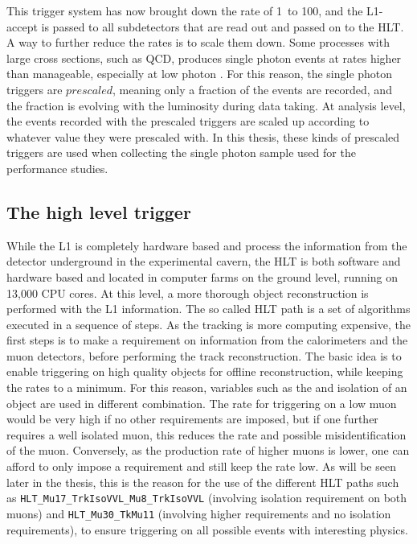 This trigger system has now brought down the rate of 1\GHz\ to 100\kHz, and the L1-accept is passed to all subdetectors that are read out and passed on to the HLT.
\newpara
\noindent\justify
A way to further reduce the rates is to scale them down. 
Some processes with large cross sections, such as QCD, produces single photon events at rates higher than manageable, especially at low photon \pt. 
For this reason, the single photon triggers are $prescaled$, meaning only a fraction of the events are recorded, and the fraction is evolving with the luminosity during data taking. 
At analysis level, the events recorded with the prescaled triggers are scaled up according to whatever value they were prescaled with. 
In this thesis, these kinds of prescaled triggers are used when collecting the single photon sample used for the \ptmiss performance studies.  
\subsection*{The high level trigger}
\noindent\justify
While the L1 is completely hardware based and process the information from the detector underground in the experimental cavern, the HLT is both software and hardware based and located in computer farms on the ground level, running on 13,000 CPU cores. 
At this level, a more thorough object reconstruction is performed with the L1 information. The so called HLT path is a set of algorithms executed in a sequence of steps. 
As the tracking is more computing expensive, the first steps is to make a requirement on information from the calorimeters and the muon detectors, before performing the track reconstruction. 
\newpara
\noindent\justify
The basic idea is to enable triggering on high quality objects for offline reconstruction, while keeping the rates to a minimum. 
For this reason, variables such as the \pt and isolation of an object are used in different combination. 
The rate for triggering on a low \pt muon would be very high if no other requirements are imposed, but if one further requires a well isolated muon, this reduces the rate and possible misidentification of the muon. 
Conversely, as the production rate of higher \pt muons is lower, one can afford to only impose a \pt requirement and still keep the rate low.   
As will be seen later in the thesis, this is the reason for the use of the different HLT paths such as \texttt{HLT\_Mu17\_TrkIsoVVL\_Mu8\_TrkIsoVVL} (involving isolation requirement on both muons) and \texttt{HLT\_Mu30\_TkMu11} (involving higher \pt requirements and no isolation requirements), to ensure triggering on all possible events with interesting physics.
